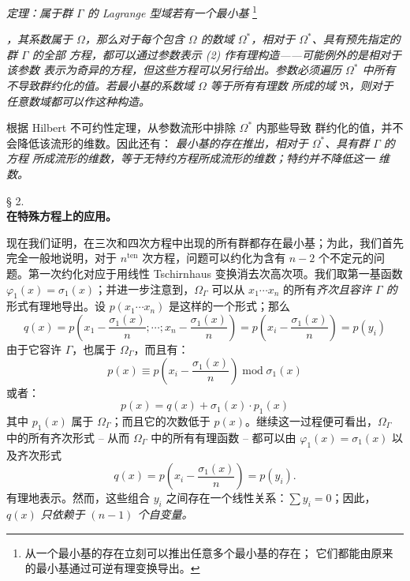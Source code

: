 \documentclass[11pt]{article}
\providecommand{\srcfn}[2]{%
  \begingroup
  \renewcommand{\thefootnote}{#1}%
  \footnote{#2}%
  \addtocounter{footnote}{-1}%
  \endgroup}
\begin{document}
\emph{定理：属于群 $\Gamma$ 的 Lagrange 型域若有一个最小基}
\srcfn{***)}{从一个最小基的存在立刻可以推出任意多个最小基的存在；
它们都能由原来的最小基通过可逆有理变换导出。}
\emph{，其系数属于 $\Omega$，那么对于每个包含 $\Omega$ 的数域
$\Omega^*$，相对于 $\Omega^*$、具有预先指定的群 $\Gamma$ 的全部
方程，都可以通过参数表示 (2) 作有理构造——可能例外的是相对于该参数
表示为奇异的方程，但这些方程可以另行给出。参数必须遍历 $\Omega^*$
中所有不导致群约化的值。若最小基的系数域 $\Omega$ 等于所有有理数
所成的域 $\mathfrak R$，则对于任意数域都可以作这种构造。}

根据 Hilbert 不可约性定理，从参数流形中排除 $\Omega^*$ 内那些导致
群约化的值，并不会降低该流形的维数。因此还有：
\emph{最小基的存在推出，相对于 $\Omega^*$、具有群 $\Gamma$ 的方程
所成流形的维数，等于无特约方程所成流形的维数；特约并不降低这一
维数。}

\begin{center}
§ 2.\\[0.75em]
\textbf{在特殊方程上的应用。}
\end{center}

现在我们证明，在三次和四次方程中出现的所有群都存在最小基；为此，我们首先完全一般地说明，对于 $n^{\text{ten}}$ 次方程，问题可以约化为含有 $n-2$ 个不定元的问题。第一次约化对应于用线性 Tschirnhaus 变换消去次高次项。我们取第一基函数 $\varphi_1(x)=\sigma_1(x)$；并进一步注意到，$\Omega_\Gamma$ 可以从 $x_1\cdots x_n$ 的所有\emph{齐次且容许 $\Gamma$ 的}形式有理地导出。设 $p(x_1\cdots x_n)$ 是这样的一个形式；那么
\[
q(x)=p\left(x_1-\frac{\sigma_1(x)}{n};\cdots;x_n-\frac{\sigma_1(x)}{n}\right)=p\left(x_i-\frac{\sigma_1(x)}{n}\right)=p(y_i)
\]
由于它容许 $\Gamma$，也属于 $\Omega_\Gamma$，而且有：
\[
p(x)\equiv p\left(x_i-\frac{\sigma_1(x)}{n}\right)\operatorname{mod}\sigma_1(x)
\]
或者：
\[
p(x)=q(x)+\sigma_1(x)\cdot p_1(x)
\]
其中 $p_1(x)$ 属于 $\Omega_\Gamma$；而且它的次数低于 $p(x)$。继续这一过程便可看出，$\Omega_\Gamma$ 中的所有齐次形式 -- 从而 $\Omega_\Gamma$ 中的所有有理函数 -- 都可以由 $\varphi_1(x)=\sigma_1(x)$ 以及齐次形式
\[
q(x)=p\left(x_i-\frac{\sigma_1(x)}{n}\right)=p(y_i).
\]
有理地表示。然而，这些组合 $y_i$ 之间存在一个线性关系：$\sum y_i=0$；因此，$q(x)$ \emph{只依赖于 $(n-1)$ 个自变量。}
\end{document}
